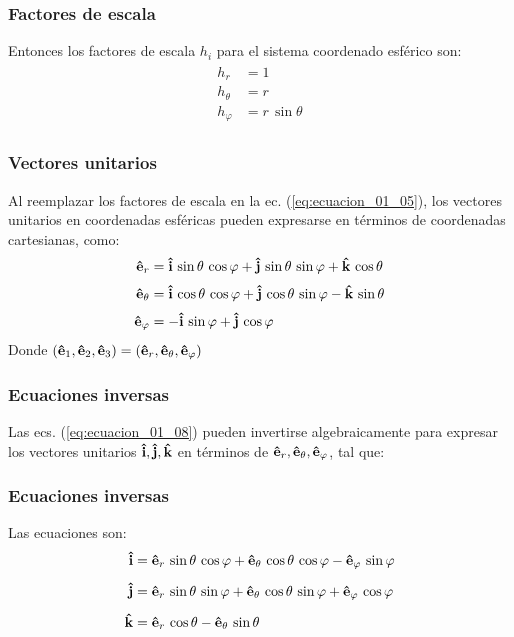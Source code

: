 \documentclass[12pt]{beamer}
\begin{document}
\begin{frame}
\frametitle{Factores de escala}
Entonces los factores de escala $h_{i}$ para el sistema coordenado esférico son:
\pause
\begin{align}
\begin{aligned}
h_{r} &= 1 \\[0.5em]
h_{\theta} &= r \\[0.5em]
h_{\varphi} &= r \, \sin \theta
\end{aligned}
\label{eq:ecuacion_01_07}
\end{align}
\end{frame}
\begin{frame}
\frametitle{Vectores unitarios}
Al reemplazar los factores de escala en la ec. (\ref{eq:ecuacion_01_05}), los vectores unitarios en coordenadas esféricas pueden expresarse en términos de coordenadas cartesianas, como:
\pause
\begin{align}
\begin{aligned}
\vu{e}_{r} &= \vu{i} \, \sin \theta \, \cos \varphi + \vu{j} \, \sin \theta \, \sin \varphi + \vu{k} \, \cos \theta \\[0.25em]
\vu{e}_{\theta} &= \vu{i} \, \cos \theta \, \cos \varphi + \vu{j} \, \cos \theta \, \sin \varphi - \vu{k} \, \sin \theta \\[0.25em]
\vu{e}_{\varphi} &= - \vu{i} \, \sin \varphi + \vu{j} \, \cos \varphi
\end{aligned}
\label{eq:ecuacion_01_08}
\end{align}
Donde $(\vu{e}_{1}, \vu{e}_{2}, \vu{e}_{3}) = (\vu{e}_{r}, \vu{e}_{\theta}, \vu{e}_{\varphi})$
\end{frame}
\begin{frame}
\frametitle{Ecuaciones inversas}
Las ecs. (\ref{eq:ecuacion_01_08}) pueden invertirse algebraicamente para expresar los vectores unitarios $\vu{i}, \vu{j}, \vu{k}$ en términos de $\vu{e}_{r}, \vu{e}_{\theta}, \vu{e}_{\varphi}$, tal que:
\end{frame}
\begin{frame}
\frametitle{Ecuaciones inversas}
Las ecuaciones son:
\pause
\begin{align*}
\vu{i} &= \vu{e}_{r} \, \sin \theta \, \cos \varphi + \vu{e}_{\theta} \, \cos \theta \, \cos \varphi - \vu{e}_{\varphi} \, \sin \varphi \\[0.5em]
\vu{j} &= \vu{e}_{r} \, \sin \theta \, \sin \varphi + \vu{e}_{\theta} \, \cos \theta \, \sin \varphi + \vu{e}_{\varphi} \, \cos \varphi \\[0.5em]
\vu{k} &= \vu{e}_{r} \, \cos \theta - \vu{e}_{\theta} \, \sin \theta
\end{align*}
\end{frame}
\end{document}
